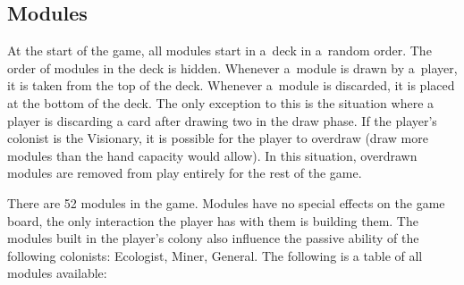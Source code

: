 \clearpage
\subsection{Modules}
\label{de:modules}

At the start of the game, all modules start in a~deck in a~random order.
The order of modules in the deck is hidden. Whenever a~module is drawn by
a~player, it is taken from the top of the deck. Whenever a~module is discarded, it
is placed at the bottom of the deck. The only exception to this is the situation where
a player is discarding a card after drawing two in the draw phase. If the player's
colonist is the Visionary, it is possible for the player to overdraw (draw more modules
than the hand capacity would allow). In this situation, overdrawn modules are removed
from play entirely for the rest of the game.

There are 52 modules in the game. Modules have no special effects on the game board,
the only interaction the player has with them is building them.
The modules built in the player's colony also influence the passive ability
of the following colonists: Ecologist, Miner, General.
The following is a table of all modules available:

